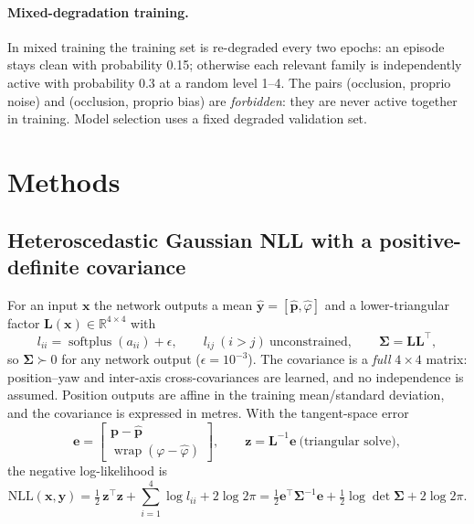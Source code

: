\documentclass[11pt,a4paper]{article}
\newcommand{\vect}[1]{\bm{#1}}
\DeclareMathOperator{\wrap}{wrap}
\begin{document}
\paragraph{Mixed-degradation training.} In mixed training the training set is re-degraded every two epochs: an episode stays clean with probability 0.15; otherwise each relevant family is independently active with probability 0.3 at a random level 1--4. The pairs (occlusion, proprio noise) and (occlusion, proprio bias) are \emph{forbidden}: they are never active together in training. Model selection uses a fixed degraded validation set.

\section{Methods}
\subsection{Heteroscedastic Gaussian NLL with a positive-definite covariance}
\label{sec:nll}
For an input $\vect x$ the network outputs a mean $\hat{\vect y}=[\hat{\vect p},\hat\varphi]$ and a lower-triangular factor $\vect L(\vect x)\in\mathbb R^{4\times4}$ with
\begin{equation}
l_{ii}=\operatorname{softplus}(a_{ii})+\epsilon,\qquad l_{ij}\ (i>j)\ \text{unconstrained},\qquad \vect\Sigma=\vect L\vect L^\top,
\end{equation}
so $\vect\Sigma\succ 0$ for any network output ($\epsilon=10^{-3}$). The covariance is a \emph{full} $4{\times}4$ matrix: position--yaw and inter-axis cross-covariances are learned, and no independence is assumed. Position outputs are affine in the training mean/standard deviation, and the covariance is expressed in metres. With the tangent-space error
\begin{equation}
\vect e=\begin{bmatrix}\vect p-\hat{\vect p}\\ \wrap(\varphi-\hat\varphi)\end{bmatrix},\qquad \vect z=\vect L^{-1}\vect e\ \text{(triangular solve)},
\end{equation}
the negative log-likelihood is
\begin{equation}
\mathrm{NLL}(\vect x,\vect y)=\tfrac12\,\vect z^\top\vect z+\sum_{i=1}^4\log l_{ii}+2\log 2\pi
=\tfrac12\vect e^\top\vect\Sigma^{-1}\vect e+\tfrac12\log\det\vect\Sigma+2\log 2\pi .
\label{eq:nll}
\end{equation}
\end{document}
